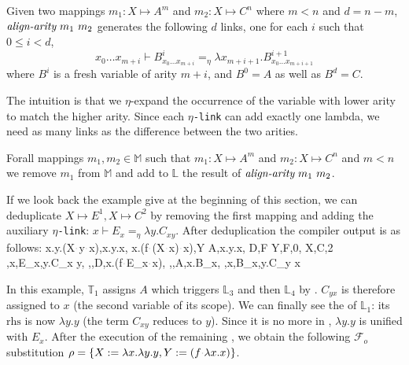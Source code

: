 \documentclass[sigconf,natbib=false,review]{acmart}
\newcommand{\appsep}{\ensuremath{\textcolor{lightgray}{\cdot}}}
\newcommand{\linkMacro}[1]{\ensuremath{#1}\texttt{-link}\xspace}
\newcommand{\linketa} {\linkMacro{\eta}}
\newcommand{\Fo}{\ensuremath{\mathcal{F}_{\!o}\xspace}} %
\newcommand{\linketaM}[3]{\ensuremath{#1 \vdash #2 =_\eta #3}}
\newcommand{\mapping}[3]{\ensuremath{#1 \mapsto #2^#3}}
\newcommand{\rhs}{\ensuremath{\mathrm{rhs}}\xspace}
\newcommand{\linkStore}{\ensuremath{\mathbb{L}}\xspace}
\newcommand{\mapStore}{\ensuremath{\mathbb{M}}\xspace}
\newcommand{\hoUnifPb}{\ensuremath{\mathbb{T}}\xspace}
\begin{document}
\newcommand{\alignarity}{\emph{align-arity}}
\begin{definition}[\alignarity] Given two mappings
  $m_1 : X \mapsto A^m$ and
  $m_2 : X \mapsto C^n$ where $m < n$ and $d = n - m$,
  $\alignarity{}~ m_1 ~ m_2$ generates the following $d$ links, one
  for each $i$ such that $0 \leq i < d$,
\[%
  \linketaM{x_0 \ldots x_{m+i}}
           {B^i_{x_0 \ldots x_{m+i}}}
           {\lambda x_{m+i+1}.B^{i+1}_{x_0 \ldots x_{m+i+1}}}
\]%
where $B^i$ is a fresh variable of arity $m+i$, and $B^0 = A$ as well as $B^d = C$.
\end{definition}

The intuition is that we $\eta$-expand the occurrence of the variable
with lower arity to match the higher arity. Since each \linketa can
add exactly one lambda, we need as many links as the difference between the
two arities.

\newcommand{\mapdeduplication}{\emph{map-deduplication}}

\begin{definition}[\mapdeduplication]
  Forall mappings $m_1, m_2\in \mapStore$ such that 
  $m_1 : X \mapsto A^m$ and
  $m_2 : X \mapsto C^n$ and $m < n$
  we remove $m_1$ from \mapStore and
  add to \linkStore the result of $\alignarity{}~m_1~m_2$.
\end{definition}

If we look back the example give at the beginning of this section, we can
deduplicate $\mapping{X}{E}{1}, \mapping{X}{C}{2}$ by removing the first mapping
and adding the auxiliary \linketa: \linketaM{x}{E_{x}}{\lambda y.C_{x y}}.
After deduplication the compiler output is as follows:
\printAlll
  {{{\lambda x.\lambda y.(X\appsep y\appsep x),\lambda x.\lambda y.x},
    {\lambda x.(f\appsep (X\appsep x)\appsep x),Y}}}
  {{{A,\lambda x.\lambda y.x},
    {D,F}}}
  {{{Y,F,0},
    {X,C,2}}}
  {{{\eta,x,E_{x},\lambda y.C_{x y}},
    {\eta,,D,\lambda x.(f\appsep E_{x}\appsep x)},
    {\eta,,A,\lambda x.B_{x}},
    {\eta,x,B_{x},\lambda y.C_{y x}}}}

In this example, $\hoUnifPb_1$ assigns $A$ which triggers $\linkStore_3$ and
then $\linkStore_4$ by \progressetaleft. $C_{yx}$ is therefore
assigned to $x$ (the second variable of its scope). We can finally see the
\progressetaright of $\linkStore_1$: its \rhs is now $\lambda y.y$ (the term $C_{xy}$
reduces to $y$). Since it is no more in \maybeeta, $\lambda y.y$ is unified with
$E_x$. After the execution of the remaining \hstep, we obtain the 
following \Fo{} substitution $\rho = \{X := \lambda x.\lambda y.y, Y := (f\appsep \lambda x.x)\}$.
\end{document}
